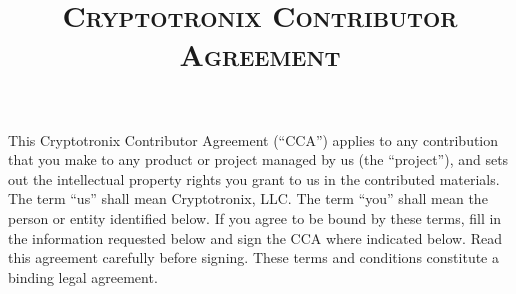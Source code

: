 \documentclass{article}
\begin{document}
\title{\textsc{Cryptotronix Contributor Agreement}}
\date{}
\maketitle

This Cryptotronix Contributor Agreement (``CCA'') applies to any
contribution that you make to any product or project managed by us
(the ``project''), and sets out the intellectual property rights you
grant to us in the contributed materials. The term ``us'' shall mean
Cryptotronix, LLC. The term ``you'' shall mean the person
or entity identified below. If you agree to be bound by these terms,
fill in the information requested below and sign the CCA where
indicated below. Read this agreement carefully before signing. These
terms and conditions constitute a binding legal agreement.
\end{document}
